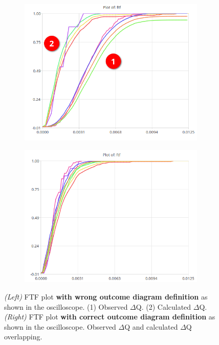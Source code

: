         \begin{figure}[H]
            \centering
            \begin{subfigure}{.5\textwidth}
                \centering
                \includegraphics[width =0.98\textwidth]{img/bad2.png}
                \label{fig:bad}
            \end{subfigure}%
            \begin{subfigure}{.5\textwidth}%
                \centering%
                \includegraphics[width =0.98\textwidth]{img/good.png}%
                \label{fig:good}%
            \end{subfigure}%
            \caption{\textit{(Left)} FTF plot \textbf{with wrong outcome diagram definition} as shown in the oscilloscope. (1) Observed $\Delta$Q. (2) Calculated $\Delta$Q. \\
            \textit{(Right)} FTF plot \textbf{with correct outcome diagram definition} as shown in the oscilloscope. Observed $\Delta$Q and calculated $\Delta$Q overlapping.}
            \label{fig:ftf_osc}%
        \end{figure}%
